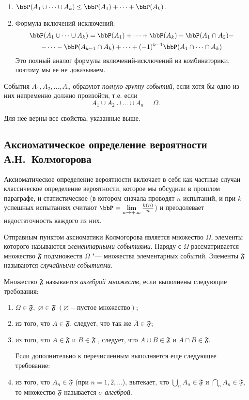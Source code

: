 \begin{enumerate}
\item
$\bbP(A_1\cup\dots\cup A_k) \le \bbP(A_1)+\dots+\bbP(A_k)$.

\item Формула вклю\-чений-исключений:
\begin{multline*}
\bbP(A_1\cup\dots\cup A_k)= \bbP(A_1)+\dots+\bbP(A_k)-\bbP(A_1\cap A_2)-\\-\dots -\bbP(A_{k-1}\cap A_{k})+ \dots + (-1)^{k-1}\bbP(A_1\cap\dots\cap A_k)
\end{multline*}
Это полный аналог формулы вклю\-чений-исключений из комбинаторики, поэтому мы ее не доказываем.
\end{enumerate}

\begin{defn}
События $A_1, A_2,  \dots, A_n$ образуют \textit{полную группу событий}, если хотя бы одно из них непременно должно произойти, т.е. если
$$
A_1\cup A_2\cup\dots\cup A_n=\Omega.
$$
\end{defn}
Для нее верны все свойства, указанные выше.
\subsection{Аксиоматическое определение вероятности А.Н.~Колмогорова}

Аксиоматическое определение вероятности включает в себя как частные случаи классическое определение вероятности, которое мы обсудили в прошлом параграфе, и статистическое (в котором сначала проводят $n$ испытаний, и при $k$ успешных испытаниях считают $\bbP=\lim_{n \to +\infty}\limits\frac{k(n)}{n}$) и преодолевает недостаточность каждого из них.

Отправным пунктом аксиоматики Колмогорова является множество $\Omega$, элементы которого называются \textit{элементарными событиями}. Наряду с $\Omega$ рассматривается множество $\mathfrak{F}$ подмножеств $\Omega$ "--- множества элементарных событий. Элементы $\mathfrak{F}$ называются \textit{случайными событиями.}
\begin{defn} Множество $\mathfrak{F}$ называется \textit{алгеброй множеств}, если выполнены следующие требования:
\begin{enumerate}
\item
$\Omega \in \mathfrak{F},\; \varnothing \in \mathfrak{F} \;(\varnothing - \text{пустое множество});$
\item
из того, что $A \in \mathfrak{F}$, следует, что так же $\overline{A} \in \mathfrak{F}$;
\item
из того, что  $A \in \mathfrak{F}$ и $B \in \mathfrak{F}$ , следует, что $A \cup B \in \mathfrak{F}$ и $A \cap B \in \mathfrak{F}$.

Если дополнительно к перечисленным выполняется еще следующее требование:
\item
из того, что $A_n \in \mathfrak{F}$ (при $n = 1,2, \ldots$), вытекает, что $\bigcup\limits_{n} A_n \in \mathfrak{F}$ и $\bigcap\limits_{n} A_n \in \mathfrak{F}$, то множество $\mathfrak{F}$ называется \textit{$\sigma$-алгеброй}. 
\end{enumerate}
\end{defn}


